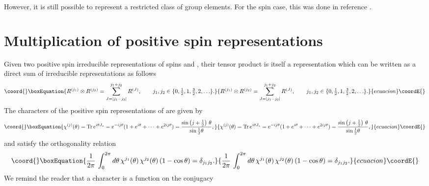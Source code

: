 \documentclass[a4paper,dvips,12pt]{article}
\providecommand {\half} {{1 \over 2}}
\providecommand {\hhalf} {{\textstyle{1 \over 2}}}
\providecommand {\Tr} {\mathrm{Tr}\,}
\begin{document}
    However, it is still possible to represent a restricted class
    of \coordHE{} group elements.  For the spin \myHighlight{$-\half$}\coordHE{} case, this
    was done in reference \cite{MYSELF}.


    \section{Multiplication of positive spin representations}

    Given two positive spin irreducible representations of spins \coordHE{} and
    \coordHE{}, their tensor product is itself a representation which
    can be written as a direct sum of irreducible representations
    as follows \cite{ELLIOTT}
    \begin{equation}\coord{}\boxEquation{
        R^{(j_1)}\otimes R^{(j_2)}
          = \sum_{J = |j_1 - j_2|}^{j_1 + j_2} R^{(J)}, \qquad
          j_1, j_2 \in \{0, \hhalf, 1, {\textstyle {3\over 2}}, 2,
       \ldots\}. \label{PRODPOSITIVE}
    }{
        R^{(j_1)}\otimes R^{(j_2)}
          = \sum_{J = |j_1 - j_2|}^{j_1 + j_2} R^{(J)}, \qquad
          j_1, j_2 \in \{0, \hhalf, 1, {\textstyle {3\over 2}}, 2,
       \ldots\}. }{ecuacion}\coordE{}\end{equation}
    The characters of the positive spin representations of \coordHE{}
    are given by
    \begin{equation}\coord{}\boxEquation{
        \chi^{(j)}(\theta) = \Tr e^{i\theta J_z} =
        e^{-ij\theta}(1 + e^{i\theta} + \cdots + e^{2ij\theta}) = {\sin \left(j + \half\right)\,\theta \over \sin
        \half\theta}, \label{CHARPOSITIVE}
    }{
        \chi^{(j)}(\theta) = \Tr e^{i\theta J_z} =
        e^{-ij\theta}(1 + e^{i\theta} + \cdots + e^{2ij\theta}) = {\sin \left(j + \half\right)\,\theta \over \sin
        \half\theta}, }{ecuacion}\coordE{}\end{equation}
    and satisfy the orthogonality relation
    \begin{equation}\coord{}\boxEquation{
        {1\over 2\pi} \,\int_0^{2\pi}
        d\theta\,\chi^{j_1}(\theta)\,
        \chi^{j_2}(\theta) \, (1 - \cos \theta) = \delta_{j_1 j_2}.
        \label{ORTHOGONALITY}
    }{
        {1\over 2\pi} \,\int_0^{2\pi}
        d\theta\,\chi^{j_1}(\theta)\,
        \chi^{j_2}(\theta) \, (1 - \cos \theta) = \delta_{j_1 j_2}.
        }{ecuacion}\coordE{}\end{equation}
    We remind the reader that a character is a function on the conjugacy
\end{document}
